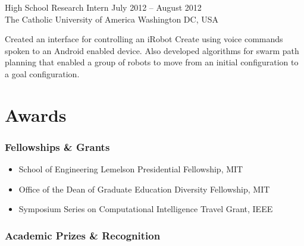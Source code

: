 \documentclass[line,margin]{cv}
\begin{document}
\begin{resume}
\begin{adjustwidth}{2.5em}{2.5em}
\end{adjustwidth}

High School Research Intern
\hfill July 2012 -- August 2012 \\
The Catholic University of America \hfill Washington DC, USA

\begin{adjustwidth}{2.5em}{2.5em}

    Created an interface for controlling an iRobot Create using voice commands
    spoken to an Android enabled device. Also developed algorithms for swarm
    path planning that enabled a group of robots to move from an initial
    configuration to a goal configuration.

\end{adjustwidth}

% 
% 
% 

\section{Awards}

\subsubsection{Fellowships \& Grants}

\begin{itemize}

    \item School of Engineering Lemelson Presidential Fellowship, MIT
    \item Office of the Dean of Graduate Education Diversity Fellowship, MIT
    \item Symposium Series on Computational Intelligence Travel Grant, IEEE

\end{itemize}

\subsubsection{Academic Prizes \& Recognition}

\begin{itemize}


\end{itemize}
\end{resume}
\end{document}
